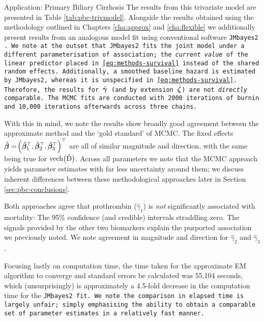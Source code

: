 \begin{chapter}{\label{cha:app-PBC}Application: Primary Biliary Cirrhosis}
  The results from this trivariate model are presented in Table \ref{tab:pbc-trivmodel}. Alongside the results obtained using the methodology outlined in Chapters \ref{cha:approx} and \ref{cha:flexible} we additionally present results from an analogous model fit using conventional software \tt{JMbayes2} \citep{R-JMbayes2}. We note at the outset that \tt{JMbayes2} fits the joint model under a different parameterisation of association; the \textit{current value} of the linear predictor placed in \eqref{eq:methods-survival} instead of the shared random effects. Additionally, a smoothed baseline hazard is estimated by \tt{JMbayes2}, whereas it is unspecified in \eqref{eq:methods-survival}. Therefore, the results for $\hat{\bm{\gamma}}$ (and by extension $\hat{\bm{\zeta}}$) are not \textit{directly} comparable. The MCMC fits are conducted with 2000 iterations of burnin and 10,000 iterations afterwards across three chains.

  With this in mind, we note the results show broadly good agreement between the approximate method and the `gold standard' of MCMC. The fixed effects $\hat{\bm{\beta}}=\!\left(\hat{\bm{\beta}}_1^\top,\hat{\bm{\beta}}_2^\top,\hat{\bm{\beta}}^\top_3\right)^\top$ are all of similar magnitude and direction, with the same being true for $\mathrm{vech}\big(\hat{\mathrm{D}}\big)$. Across all parameters we note that the MCMC approach yields parameter estimates with far less uncertainty around them; we discuss inherent differences between these methodological approaches later in Section \ref{sec:pbc-conclusions}. 
  
  Both approaches agree that prothrombin ($\hat{\gamma}_1$) is \textit{not} significantly associated with mortality: The 95\% confidence (and credible) intervals straddling zero. The signals provided by the other two biomarkers explain the purported association we previously noted. We note agreement in magnitude and direction for $\hat{\gamma}_2$ and $\hat{\gamma}_3$. 
  
  Focusing lastly on computation time, the time taken for the approximate EM algorithm to converge and standard errors be calculated was 55.104 seconds, which (unsurprisingly) is approximately a 4.5-fold decrease in the computation time for the \tt{JMbayes2} fit. We note the comparison in elapsed time is largely unfair; simply emphasising the ability to obtain a comparable set of parameter estimates in a relatively fast manner.


\end{chapter}
